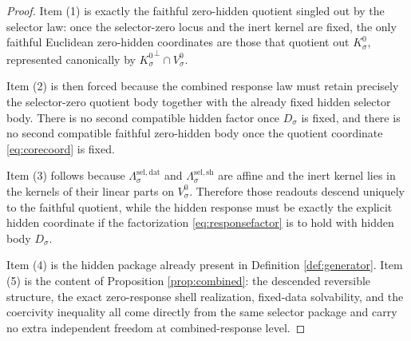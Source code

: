 \documentclass[11pt]{article}
\newcommand{\GapBody}[1]{D_{#1}}
\newcommand{\GenData}[1]{\Lambda_{#1}^{\mathrm{sel,dat}}}
\newcommand{\GenShell}[1]{\Lambda_{#1}^{\mathrm{sel,sh}}}
\newcommand{\ZeroHiddenVec}[1]{V_{#1}^{0}}
\newcommand{\Kernel}[1]{K_{#1}^{0}}
\begin{document}
\begin{proof}
Item (1) is exactly the faithful zero-hidden quotient singled out by the selector law: once the selector-zero locus and the inert kernel are fixed, the only faithful Euclidean zero-hidden coordinates are those that quotient out \(\Kernel{\sigma}\), represented canonically by \({\Kernel{\sigma}}^{\perp}\cap\ZeroHiddenVec{\sigma}\).

Item (2) is then forced because the combined response law must retain precisely the selector-zero quotient body together with the already fixed hidden selector body. There is no second compatible hidden factor once \(\GapBody{\sigma}\) is fixed, and there is no second compatible faithful zero-hidden body once the quotient coordinate \eqref{eq:corecoord} is fixed.

Item (3) follows because \(\GenData{\sigma}\) and \(\GenShell{\sigma}\) are affine and the inert kernel lies in the kernels of their linear parts on \(\ZeroHiddenVec{\sigma}\). Therefore those readouts descend uniquely to the faithful quotient, while the hidden response must be exactly the explicit hidden coordinate if the factorization \eqref{eq:responsefactor} is to hold with hidden body \(\GapBody{\sigma}\).

Item (4) is the hidden package already present in Definition \ref{def:generator}. Item (5) is the content of Proposition \ref{prop:combined}: the descended reversible structure, the exact zero-response shell realization, fixed-data solvability, and the coercivity inequality all come directly from the same selector package and carry no extra independent freedom at combined-response level.
\end{proof}
\end{document}
